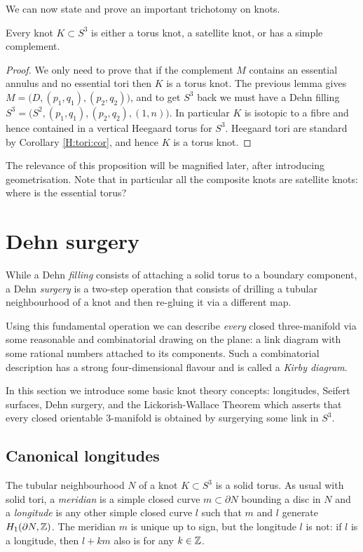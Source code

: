 We can now state and prove an important trichotomy on knots. 

\begin{prop} \label{trichotomy:knots:prop}
Every knot $K\subset S^3$ is either a torus knot, a satellite knot, or has a simple complement.
\end{prop}
\begin{proof}
We only need to prove that if the complement $M$ contains an essential annulus and no essential tori then $K$ is a torus knot. The previous lemma gives $M=\big(D,(p_1,q_1),(p_2,q_2)\big)$, and to get $S^3$ back we must have a Dehn filling $S^3 = \big(S^2,(p_1,q_1), (p_2,q_2), (1,n)\big)$. In particular $K$ is isotopic to a fibre and hence contained in a vertical Heegaard torus for $S^3$. Heegaard tori are standard by Corollary \ref{H:tori:cor}, and hence $K$ is a torus knot.
\end{proof}

The relevance of this proposition will be magnified later, after introducing geometrisation. Note that in particular all the composite knots are satellite knots: where is the essential torus?

\section{Dehn surgery}
While a Dehn \emph{filling} consists of attaching a solid torus to a boundary component, a Dehn \emph{surgery} is a two-step operation that consists of drilling a tubular neighbourhood of a knot and then re-gluing it via a different map. 

Using this fundamental operation we can describe \emph{every} closed three-manifold via some reasonable and combinatorial drawing on the plane: a link diagram with some rational numbers attached to its components. Such a combinatorial description has a strong four-dimensional flavour and is called a \emph{Kirby diagram}.

In this section we introduce some basic knot theory concepts: longitudes, Seifert surfaces, Dehn surgery, and the Lickorish-Wallace Theorem which asserts that every closed orientable 3-manifold is obtained by surgerying some link in $S^3$.

\subsection{Canonical longitudes} \label{canonical:longitudes:subsection}
The tubular neighbourhood $N$ of a knot $K\subset S^3$ is a solid torus. As usual with solid tori, a \emph{meridian} is a simple closed curve $m\subset \partial N$ bounding a disc in $N$ and a \emph{longitude} is any other simple closed curve $l$ such that $m$ and $l$ generate $H_1(\partial N,\mathbb{Z})$. The meridian $m$ is unique up to sign, but the longitude $l$ is not: if $l$ is a longitude, then $l+km$ also is for any $k\in \mathbb{Z}$. 


